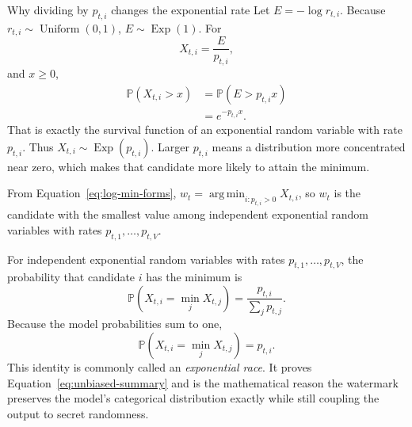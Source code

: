 \documentclass[11pt]{article}
\DeclareRobustCommand{\iperpaper}[2]{%
  \begingroup
  \hypersetup{pdfborder=0 0 0}%
  \href{iperpaper:#1}{{\color{iperpaperlink}#2}}%
  \endgroup
}
\def\iperpaper#1#2{#2}%
\newcommand{\U}{\operatorname{Uniform}}
\newcommand{\Exp}{\operatorname{Exp}}
\newcommand{\Pp}{\mathbb{P}}
\newcommand{\argmin}{\operatorname*{arg\,min}}
\begin{document}
\begin{leveltwo}{Why dividing by \texorpdfstring{$p_{t,i}$}{pti} changes the exponential rate}
Let $E=-\log r_{t,i}$. Because $r_{t,i}\sim\iperpaper{uniform_symbol}{\U}(0,1)$, $E\sim\iperpaper{exp_symbol}{\Exp}(1)$. For
\[
  X_{t,i}=\frac{E}{p_{t,i}},
\]
and $x\ge0$,
\begin{align*}
\Pp(X_{t,i}>x)
&=\Pp\!\left(E>p_{t,i}x\right)\\
&=e^{-p_{t,i}x}.
\end{align*}
That is exactly the survival function of an exponential random variable with rate $p_{t,i}$. Thus $X_{t,i}\sim\iperpaper{exp_symbol}{\Exp}(p_{t,i})$. Larger $p_{t,i}$ means a distribution more concentrated near zero, which makes that candidate more likely to attain the minimum.
\end{leveltwo}


From Equation~\eqref{eq:log-min-forms}, $w_t=\iperpaper{argmin_symbol}{\argmin}_{i:p_{t,i}>0}X_{t,i}$, so $w_t$ is the candidate with the smallest value among independent exponential random variables with rates $p_{t,1},\ldots,p_{t,V}$.

For independent exponential random variables with rates $p_{t,1},\ldots,p_{t,V}$, the probability that candidate $i$ has the minimum is
\[
  \Pp(X_{t,i}=\min_jX_{t,j})
  =\frac{p_{t,i}}{\sum_jp_{t,j}}.
\]
Because the model probabilities sum to one,
\[
  \iperpaper{exponential_race}{\Pp(X_{t,i}=\min_jX_{t,j})=p_{t,i}}.
\]
This identity is commonly called an \iperpaper{exponential_race_concept}{\emph{exponential race}}. It proves Equation~\eqref{eq:unbiased-summary} and is the mathematical reason the watermark preserves the model's \iperpaper{categorical_name}{categorical} distribution exactly while still coupling the output to secret randomness.
\end{document}
